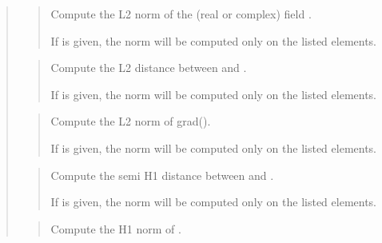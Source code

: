 \documentclass[a4paper,11pt,english]{sphinxmanual}
\begin{document}
\begin{quote}

\begin{quote}

Compute the L2 norm of the (real or complex) field .

If  is given, the norm will be computed only on the listed
elements.
\end{quote}

\begin{quote}

Compute the L2 distance between  and .

If  is given, the norm will be computed only on the listed
elements.
\end{quote}

\begin{quote}

Compute the L2 norm of grad().

If  is given, the norm will be computed only on the listed
elements.
\end{quote}

\begin{quote}

Compute the semi H1 distance between  and .

If  is given, the norm will be computed only on the listed
elements.
\end{quote}

\begin{quote}

Compute the H1 norm of .


\end{quote}
\end{quote}
\end{document}
